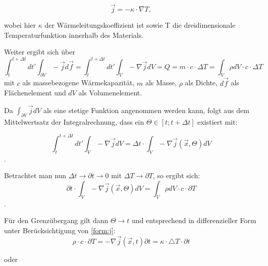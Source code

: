 \begin{equation}
\vec{j} = - \kappa \cdot \nabla T, 
\label{form:j}
\end{equation}

wobei hier $ \kappa $ der Wärmeleitungskoeffizient ist sowie T die dreidimensionale Temperaturfunktion innerhalb des Materials. 

Weiter ergibt sich über
\begin{equation}
\int_{t}^{t+\Delta t} dt' \int_{\partial V} -\vec{j} d \vec{f} = \int_{t}^{t + \Delta t} dt' \int_{V} -\nabla \vec{j} dV = Q = m \cdot c \cdot \Delta T = \int_{V} \rho dV \cdot c \cdot \Delta T
\end{equation}
mit $c$ als massebezogene Wärmekapazität, $m$ als Masse, $\rho$ als Dichte, $ d \vec{f} $ als Flächenelement und $ dV $ als Volumenelement. 

Da $ \int_{\partial V} \vec{j} dV $ als eine stetige Funktion angenommen werden kann, folgt aus dem Mittelwertsatz der Integralrechnung, dass ein $ \Theta \in [t; t + \Delta t] $ existiert mit:

\begin{equation}
\int_{t}^{t + \Delta t} dt' \int_{V} -\nabla \vec{j} dV = \Delta t \cdot \int_{V} -\nabla \vec{j}(\vec{x}, \Theta) dV
\end{equation}. 

Betrachtet man nun $ \Delta t \to \partial t \to 0 $ mit $\Delta T \to \partial T $, so ergibt sich:
\begin{equation}
\partial t \cdot \int_{V} -\nabla \vec{j}(\vec{x}, \Theta) dV = \int_{V} \rho dV \cdot c \cdot \partial T
\end{equation}.
 
Für den Grenzübergang gilt dann $\Theta \to t$ und entsprechend in differenzieller Form unter Berücksichtigung von \ref{form:j}: 
\begin{equation}
\rho \cdot c \cdot \partial T = -\nabla \vec{j}(\vec{x}, t) \partial t = \kappa \cdot \triangle T \cdot \partial t
\end{equation}


oder

